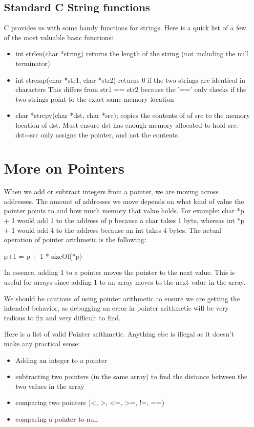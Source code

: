 \documentclass[letterpaper]{article}
\theoremstyle{remark}
\begin{document}
\subsection{Standard C String functions}
C provides us with some handy functions for strings. Here is a quick list of a few of the most valuable basic functions:
\begin{itemize}
    \item int strlen(char *string) returns the length of the string (not including the null terminator)
    \item int strcmp(char *str1, char *str2) returns 0 if the two strings are identical in characters This differs from str1 == str2 because the '==' only checks if the two strings point to the exact same memory location
    \item char *strcpy(char *dst, char *src); copies the contents of of src to the memory location of dst. Must ensure dst has enough memory allocated to hold src. dst=src only assigns the pointer, and not the contents
\end{itemize}

\section{More on Pointers}
When we add or subtract integers from a pointer, we are moving across addresses. The amount of addresses we move depends on what kind of value the pointer points to and how much memory that value holds. For example: char *p + 1 would add 1 to the address of p because a char takes 1 byte, whereas int *p + 1 would add 4 to the address because an int takes 4 bytes. The actual operation of pointer arithmetic is the following:

p+1 = p + 1 * sizeOf(*p)

In essence, adding 1 to a pointer moves the pointer to the next value. This is useful for arrays since adding 1 to an array moves to the next value in the array.

We should be cautious of using pointer arithmetic to ensure we are getting the intended behavior, as debugging an error in pointer arithmetic will be very tedious to fix and very difficult to find.

Here is a list of valid Pointer arithmetic. Anything else is illegal as it doesn't make any practical sense:
\begin{itemize}
    \item Adding an integer to a pointer
    \item subtracting two pointers (in the same array) to find the distance between the two values in the array
    \item comparing two pointers (<, >, <=, >=, !=, ==)
    \item comparing a pointer to null
\end{itemize}
\end{document}
